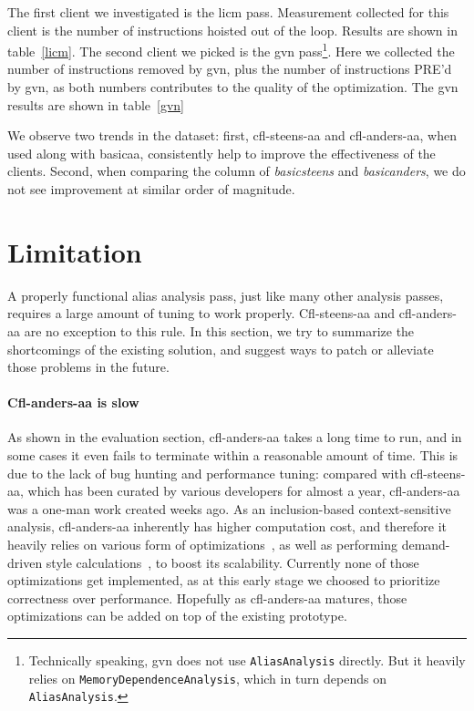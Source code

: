 \documentclass[10pt]{article}
\begin{document}
The first client we investigated is the licm pass. Measurement collected for
this client is the number of instructions hoisted out of the loop. Results are
shown in table~\ref{licm}. The second client we picked is the gvn pass\footnote{Technically
speaking, gvn does not use \texttt{AliasAnalysis} directly. But it heavily
relies on \texttt{MemoryDependenceAnalysis}, which in turn depends on
\texttt{AliasAnalysis}.}. Here we collected the number of instructions removed
by gvn, plus the number of instructions PRE'd by gvn, as both numbers
contributes to the quality of the optimization. The gvn results are shown in table~\ref{gvn}

We observe two trends in the dataset: first, cfl-steens-aa and cfl-anders-aa,
when used along with basicaa, consistently help to improve the effectiveness of
the clients. Second, when comparing the column of \emph{basicsteens} and \emph{basicanders}, we do not see
improvement at similar order of magnitude. 




\section{Limitation}\label{limitation}

A properly functional alias analysis pass, just like many other analysis passes,
requires a large amount of tuning to work properly. Cfl-steens-aa and
cfl-anders-aa are no exception to this rule. In this section, we try to
summarize the shortcomings of the existing solution, and suggest ways to patch
or alleviate those problems in the future.

\paragraph{Cfl-anders-aa is slow} 

As shown in the evaluation section, cfl-anders-aa takes a long time to run, and
in some cases it even fails to terminate within a reasonable amount of time.
This is due to the lack of bug hunting and performance tuning: compared with cfl-steens-aa,
which has been curated by various developers for almost a year, cfl-anders-aa
was a one-man work created weeks
ago. As an inclusion-based context-sensitive analysis, cfl-anders-aa
inherently has higher computation cost, and therefore it heavily relies on
various form of optimizations~\cite{Hardekopf:2007}\cite{Hardekopf:2007_2}, as
well as performing demand-driven style calculations~\cite{Zheng:2008}, to boost its scalability. Currently none of those
optimizations get implemented, as at this early stage we choosed to prioritize
correctness over performance. Hopefully as cfl-anders-aa matures, those
optimizations can be added on top of the existing prototype.
\end{document}
